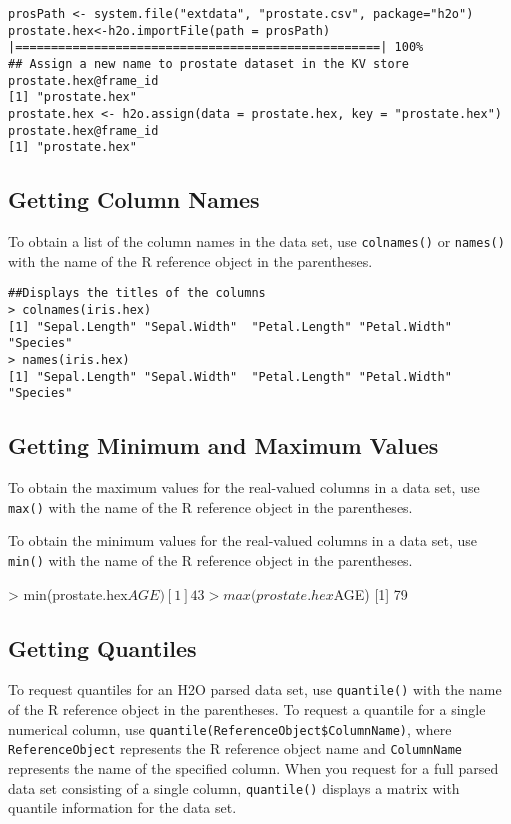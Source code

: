 \begin{lstlisting}[style=R]
prosPath <- system.file("extdata", "prostate.csv", package="h2o")
prostate.hex<-h2o.importFile(path = prosPath)
|===================================================| 100%
## Assign a new name to prostate dataset in the KV store
prostate.hex@frame_id
[1] "prostate.hex"
prostate.hex <- h2o.assign(data = prostate.hex, key = "prostate.hex")
prostate.hex@frame_id
[1] "prostate.hex"

\end{lstlisting}

\subsection{Getting Column Names}

To obtain a list of the column names in the data set, use {\texttt{colnames()}} or {\texttt{names()}} with the name of the R reference object in the parentheses.

\begin{lstlisting}[style=R]
##Displays the titles of the columns
> colnames(iris.hex)
[1] "Sepal.Length" "Sepal.Width"  "Petal.Length" "Petal.Width"  "Species"     
> names(iris.hex)
[1] "Sepal.Length" "Sepal.Width"  "Petal.Length" "Petal.Width"  "Species"     
\end{lstlisting}


\subsection{Getting Minimum and Maximum Values}

To obtain the maximum values for the real-valued columns in a data set, use {\texttt{max()}} with the name of the R reference object in the parentheses.

To obtain the minimum values for the real-valued columns in a data set, use {\texttt{min()}} with the name of the R reference object in the parentheses.
\begin{spverbatim}
> min(prostate.hex$AGE)
[1] 43
> max(prostate.hex$AGE)
[1] 79
\end{spverbatim}


\subsection{Getting Quantiles}

To request quantiles for an H2O parsed data set, use {\texttt{quantile()}} with the name of the R reference object in the parentheses.
To request a quantile for a single numerical column, use {\texttt{quantile(ReferenceObject\$ColumnName)}},  where {\texttt{ReferenceObject}} represents the R reference object name and {\texttt{ColumnName}} represents the name of the specified column. 
When you request for a full parsed data set consisting of a single column, {\texttt{quantile()}} displays a matrix with quantile information for the data set. 

